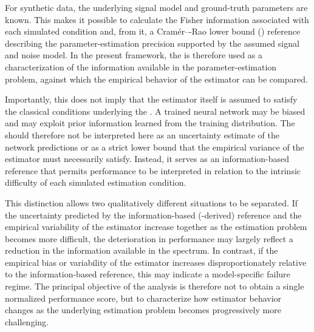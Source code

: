 For synthetic data, the underlying signal model and ground-truth parameters are known. This makes it possible to calculate the Fisher information associated with each simulated condition and, from it, a Cram\'{e}r–-Rao lower bound (\CRLB) reference describing the parameter-estimation precision supported by the assumed signal and noise model. In the present framework, the \CRLB is therefore used as a characterization of the information available in the parameter-estimation problem, against which the empirical behavior of the \DL estimator can be compared.

Importantly, this does not imply that the \DL estimator itself is assumed to satisfy the classical conditions underlying the \CRLB. A trained neural network may be biased and may exploit prior information learned from the training distribution. The \CRLB should therefore not be interpreted here as an uncertainty estimate of the network predictions or as a strict lower bound that the empirical variance of the \DL estimator must necessarily satisfy. Instead, it serves as an information-based reference that permits performance to be interpreted in relation to the intrinsic difficulty of each simulated estimation condition.

This distinction allows two qualitatively different situations to be separated. If the uncertainty predicted by the information-based (\CRLB-derived) reference and the empirical variability of the \DL estimator increase together as the estimation problem becomes more difficult, the deterioration in performance may largely reflect a reduction in the information available in the spectrum. In contrast, if the empirical bias or variability of the \DL estimator increases disproportionately relative to the information-based reference, this may indicate a model-specific failure regime. The principal objective of the analysis is therefore not to obtain a single normalized performance score, but to characterize how estimator behavior changes as the underlying estimation problem becomes progressively more challenging.

